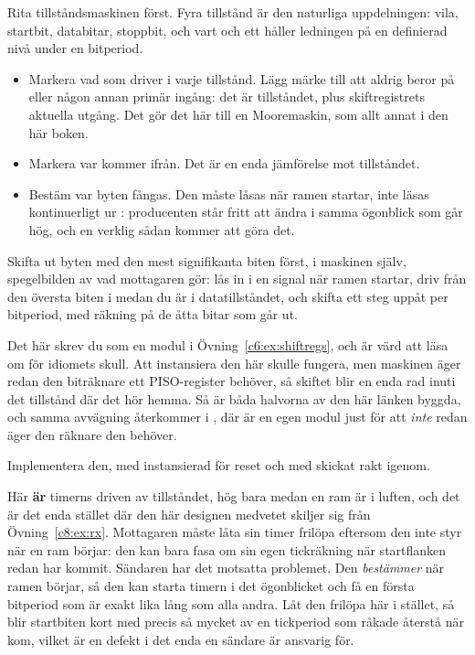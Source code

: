  Rita tillståndsmaskinen först. Fyra tillstånd är den naturliga uppdelningen: vila,
startbit, databitar, stoppbit, och vart och ett håller ledningen på en definierad nivå under en
bitperiod.
\begin{itemize}
  \item Markera vad som driver  i varje tillstånd. Lägg märke till att  aldrig
    beror på  eller någon annan primär ingång: det är tillståndet, plus skiftregistrets
    aktuella utgång. Det gör det här till en Mooremaskin, som allt annat i den här boken.
  \item Markera var  kommer ifrån. Det är en enda jämförelse mot tillståndet.
  \item Bestäm var byten fångas. Den måste låsas när ramen startar, inte läsas kontinuerligt ur
    : producenten står fritt att ändra  i samma ögonblick som
     går hög, och en verklig sådan kommer att göra det.
\end{itemize}

 Skifta ut byten med den mest signifikanta biten först, i maskinen själv, spegelbilden av
vad mottagaren gör: lås in  i en signal  när ramen startar, driv 
från den översta biten i  medan du är i datatillståndet, och skifta  ett steg
uppåt per bitperiod, med räkning på de åtta bitar som går ut.

Det här skrev du som en modul i Övning~\ref{c6:ex:shiftregs}, och  är värd att läsa om
för idiomets skull. Att instansiera den här skulle fungera, men maskinen äger redan den biträknare
ett PISO-register behöver, så skiftet blir en enda rad inuti det tillstånd där det hör hemma. Så är
båda halvorna av den här länken byggda, och samma avvägning återkommer i , där
 är en egen modul just för att  \emph{inte} redan äger den
räknare den behöver.

 Implementera den, med  instansierad för reset och  med
 skickat rakt igenom.

Här \textbf{är} timerns  driven av tillståndet, hög bara medan en ram är i luften, och
det är det enda stället där den här designen medvetet skiljer sig från Övning~\ref{c8:ex:rx}.
Mottagaren måste låta sin timer frilöpa eftersom den inte styr när en ram börjar: den kan bara fasa
om sin egen tickräkning när startflanken redan har kommit. Sändaren har det motsatta problemet. Den
\emph{bestämmer} när ramen börjar, så den kan starta timern i det ögonblicket och få en första
bitperiod som är exakt lika lång som alla andra. Låt den frilöpa här i stället, så blir startbiten
kort med precis så mycket av en tickperiod som råkade återstå när  kom, vilket är en
defekt i det enda en sändare är ansvarig för.

